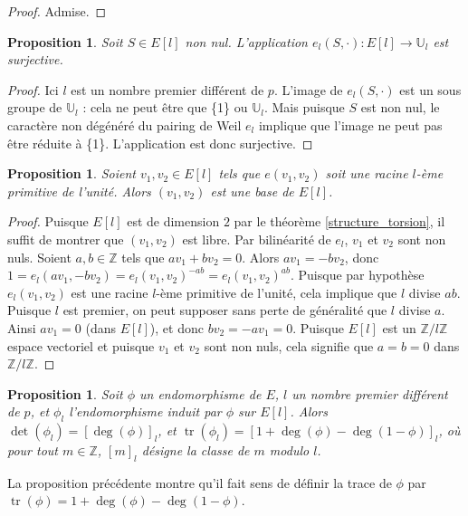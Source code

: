 \documentclass{article}
\theoremstyle{plain}%
\newtheorem{prop}[thm]{Proposition}
\theoremstyle{definition}%
\newcommand{\Z}{\mathbb{Z}}
\newcommand{\U}{\mathbb{U}}
\DeclareMathOperator{\tr}{tr}
\begin{document}
\begin{proof}
  Admise.
\end{proof}

\begin{prop}
  \label{surj_el}
  Soit $S\in E[l]$ non nul. L'application $e_l(S,\cdot):E[l] \to \mathbb{U}_l$ est surjective.
\end{prop}

\begin{proof}
  Ici $l$ est un nombre premier différent de $p$. L'image de  $e_l(S,\cdot)$ est un sous groupe de $\mathbb{U}_l$ : cela ne peut être que \{1\} ou $\U_l$. Mais puisque $S$ est non nul, le caractère non dégénéré du pairing de Weil $e_l$ implique que l'image ne peut pas être réduite à \{1\}. L'application est donc surjective.
\end{proof}

\begin{prop}
  \label{pairing_base}
  Soient $v_1, v_2\in E[l]$ tels que $e(v_1, v_2)$ soit une racine $l$-ème primitive de l'unité. Alors $(v_1, v_2)$ est une base de $E[l]$. 
\end{prop}

\begin{proof}
  Puisque $E[l]$ est de dimension $2$ par le théorème \ref{structure_torsion}, il suffit de montrer que $(v_1, v_2)$ est libre. Par bilinéarité de $e_l$, $v_1$ et $v_2$ sont non nuls. Soient $a, b\in\Z$ tels que $av_1 + bv_2 = 0$. Alors $av_1 = -bv_2$, donc $1 = e_l(av_1, -bv_2) = e_l(v_1, v_2)^{-ab} = e_l(v_1, v_2)^{ab}$. Puisque par hypothèse $e_l(v_1, v_2)$ est une racine $l$-ème primitive de l'unité, cela implique que $l$ divise $ab$. Puisque $l$ est premier, on peut supposer sans perte de généralité que $l$ divise $a$. Ainsi $av_1 = 0$ (dans $E[l]$), et donc $bv_2=-av_1=0$. Puisque $E[l]$ est un $\Z/l\Z$ espace vectoriel et puisque $v_1$ et $v_2$ sont non nuls, cela signifie que $a=b=0$ dans $\Z/l\Z$.
\end{proof}

\begin{prop}
  \label{dettr}
  Soit $\phi$ un endomorphisme de $E$, $l$ un nombre premier différent de $p$, et $\phi_l$ l'endomorphisme induit par $\phi$ sur $E[l]$. Alors $\det(\phi_l) = [\deg(\phi)]_l$, et $\tr(\phi_l) = [1 + \deg(\phi) - \deg(1-\phi)]_l$, où pour tout $m\in\Z$, $[m]_l$ désigne la classe de $m$ modulo $l$. 
\end{prop}

La proposition précédente montre qu'il fait sens de définir la trace de $\phi$ par $\tr(\phi) = 1 + \deg(\phi) - \deg(1-\phi)$.
\end{document}
